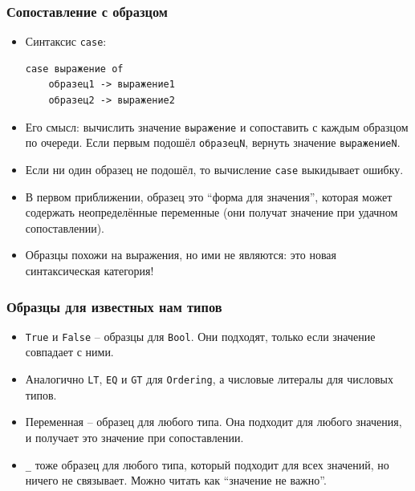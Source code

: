 \documentclass[12pt]{beamer}
\begin{document}
\begingroup
\footnotesize
\begin{frame}[fragile]
\frametitle{Сопоставление с образцом}
\begin{itemize}
    \item Синтаксис \lstinline|case|: \\
\begin{lstlisting}
case выражение of 
    образец1 -> выражение1 
    образец2 -> выражение2
\end{lstlisting}
    \item Его смысл: вычислить значение \lstinline|выражение| и сопоставить с каждым образцом по очереди. Если первым подошёл \lstinline|образецN|, вернуть значение \lstinline|выражениеN|.
    \item Если ни один образец не подошёл, то вычисление \lstinline|case| выкидывает ошибку.
    \item В первом приближении, образец это \enquote{форма для значения}, которая может содержать неопределённые переменные (они получат значение при удачном сопоставлении). 
    \item Образцы похожи на выражения, но ими не являются: это новая синтаксическая категория!
\end{itemize}
\end{frame}
\endgroup

\begin{frame}[fragile]
\frametitle{Образцы для известных нам типов}
\begin{itemize}
    \item \lstinline|True| и \lstinline|False| -- образцы для \lstinline|Bool|. Они подходят, только если значение совпадает с ними. 
    \item Аналогично \lstinline|LT|, \lstinline|EQ| и \lstinline|GT| для \lstinline|Ordering|, а числовые литералы для числовых типов.
    \item Переменная -- образец для любого типа. Она подходит для любого значения, и получает это значение при сопоставлении.
\item \lstinline|_| тоже образец для любого типа, который подходит для всех значений, но ничего не связывает. Можно читать как \enquote{значение не важно}.
\end{itemize}
\end{frame}
\end{document}
